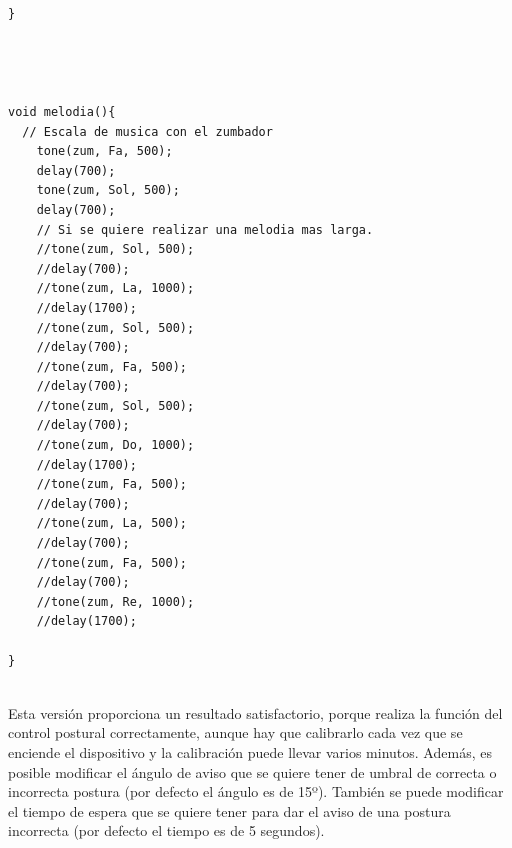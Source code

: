 \begin{lstlisting}
}




void melodia(){
  // Escala de musica con el zumbador
    tone(zum, Fa, 500);
    delay(700);
    tone(zum, Sol, 500);
    delay(700);
    // Si se quiere realizar una melodia mas larga.
    //tone(zum, Sol, 500);
    //delay(700);
    //tone(zum, La, 1000);
    //delay(1700);
    //tone(zum, Sol, 500);
    //delay(700);
    //tone(zum, Fa, 500);
    //delay(700);
    //tone(zum, Sol, 500);
    //delay(700);
    //tone(zum, Do, 1000);
    //delay(1700);
    //tone(zum, Fa, 500);
    //delay(700);
    //tone(zum, La, 500);
    //delay(700);
    //tone(zum, Fa, 500);
    //delay(700);
    //tone(zum, Re, 1000);
    //delay(1700);
    
}


\end{lstlisting}

Esta versión proporciona un resultado satisfactorio, porque realiza la función del control postural correctamente, aunque hay que calibrarlo cada vez que se enciende el dispositivo y la calibración puede llevar varios minutos. Además, es posible modificar el ángulo de aviso que se quiere tener de umbral de correcta o incorrecta postura (por defecto el ángulo es de 15º). También se puede modificar el tiempo de espera que se quiere tener para dar el aviso de una postura incorrecta (por defecto el tiempo es de 5 segundos).

